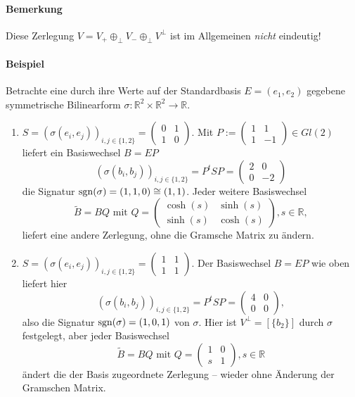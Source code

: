 \paragraph{Bemerkung}
	Diese Zerlegung $ V= V_+ \oplus_\perp V_- \oplus_\perp V^\perp $ ist im Allgemeinen \emph{nicht} eindeutig!
\paragraph{Beispiel}
	Betrachte eine durch ihre Werte auf der Standardbasis $ E=(e_1,e_2) $ gegebene symmetrische Bilinearform $ \sigma: \mathbb{R}^2\times \mathbb{R}^2 \to \mathbb{R} $.
		\begin{enumerate}
			\item $ S=(\sigma(e_i,e_j))_{i,j\in \{1,2\}} =
			\begin{pmatrix}
				0&1\\1& 0
			\end{pmatrix} $. Mit $ P:=\begin{pmatrix}
			1&1\\ 1& -1
			\end{pmatrix}\in Gl(2) $ liefert ein Basiswechsel $ B=EP $
				\[ (\sigma(b_i,b_j))_{i,j\in \{1,2\}} = P^tSP = \begin{pmatrix}
				2 & 0 \\ 0 & -2
				\end{pmatrix} \]
			die Signatur $ \operatorname{sgn}(\sigma) = (1,1,0)\cong (1,1) $.
			Jeder weitere Basiswechsel
				\[ \tilde{B}=BQ \text{ mit } Q = \begin{pmatrix}
				\cosh(s) & \sinh(s)\\ \sinh(s)& \cosh(s) 
				\end{pmatrix}, s\in \mathbb{R}, \]
			liefert eine andere Zerlegung, ohne die Gramsche Matrix zu ändern.
			\item $ S=(\sigma(e_i,e_j))_{i,j\in \{1,2\}}= \begin{pmatrix}
			1 & 1\\ 1 & 1
			\end{pmatrix}. $ Der Basiswechsel $ B=EP $ wie oben liefert hier
				\[ (\sigma(b_i,b_j))_{i,j\in \{1,2\}} = P^tSP = \begin{pmatrix}
				4 & 0 \\ 0 & 0
				\end{pmatrix}, \]
			also die Signatur $ \operatorname{sgn}(\sigma) = (1,0,1) $ von $ \sigma $. Hier ist $ V^\perp = [\{b_2\}]$ durch $ \sigma $ festgelegt, aber jeder Basiswechsel
				\[ \tilde{B} = BQ \text{ mit } Q= \begin{pmatrix}
				1 & 0 \\ s & 1
				\end{pmatrix}, s\in \mathbb{R} \]
			ändert die der Basis zugeordnete Zerlegung -- wieder ohne Änderung der Gramschen Matrix.
		\end{enumerate}

